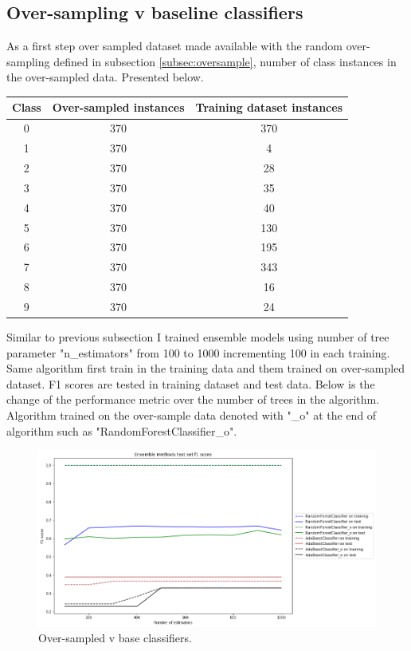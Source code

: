 \documentclass[12pt]{article}
\begin{document}
\subsection{Over-sampling v baseline classifiers}
As a first step over sampled dataset made available with the random over-sampling defined in subsection \ref{subsec:oversample}, number of class instances in the over-sampled data. Presented below.

\begin{center}
    \begin{tabular}{||c c c||} 
    \hline
    Class & Over-sampled instances & Training dataset instances\\ [0.5ex] 
    \hline\hline
    0 & 370 & 370\\ 
    \hline
    1 & 370 & 4\\
    \hline
    2 & 370 & 28\\
    \hline
    3 & 370 & 35\\
    \hline
    4 & 370 & 40\\
    \hline
    5 & 370 & 130\\
    \hline
    6 & 370 & 195\\
    \hline
    7 & 370 & 343\\
    \hline
    8 & 370 & 16\\
    \hline
    9 & 370 & 24\\ [1ex] 
    \hline
   \end{tabular}
\end{center}

Similar to previous subsection I trained ensemble models using number of tree parameter "n\_estimators" from 100 to 1000 incrementing 100 in each training. Same algorithm first train in the training data and them trained on over-sampled dataset. F1 scores are tested in training dataset and test data. Below is the change of the performance metric over the number of trees in the algorithm. Algorithm trained on the over-sample data denoted with "\_o" at the end of algorithm such as "RandomForestClassifier\_o".

\begin{figure}[H] \label{fig:overscomp}
    \centering
    \includegraphics[width=\textwidth]{img/ensembleoversample.png}
    \caption{Over-sampled v base classifiers.}
\end{figure}
\end{document}
